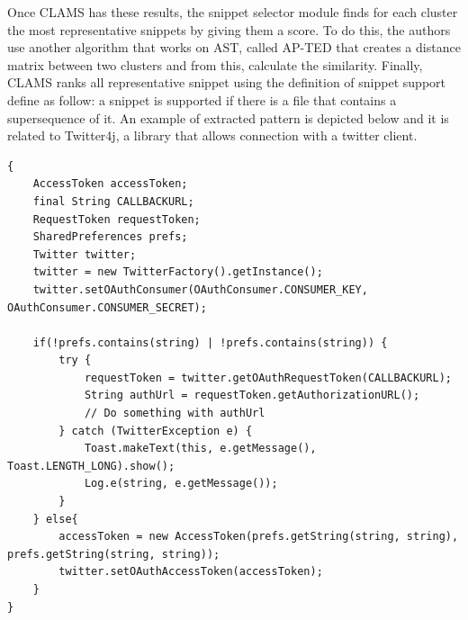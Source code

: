 Once CLAMS has these results, the snippet selector module finds for each cluster the most representative snippets by giving them a score. To do this, 
the authors use another algorithm that works on AST, called AP-TED that creates a distance matrix between two clusters and from this, calculate the similarity. Finally, CLAMS ranks all representative snippet using the definition of snippet support define as follow: a snippet is supported if there is a file that contains a supersequence of it. An example of extracted pattern is depicted below and it is related to Twitter4j, a library that allows connection with a twitter client. 
\begin{lstlisting}
{
    AccessToken accessToken;
    final String CALLBACKURL;
    RequestToken requestToken;
    SharedPreferences prefs;
    Twitter twitter;
    twitter = new TwitterFactory().getInstance();
    twitter.setOAuthConsumer(OAuthConsumer.CONSUMER_KEY, OAuthConsumer.CONSUMER_SECRET);

    if(!prefs.contains(string) | !prefs.contains(string)) {
        try {
            requestToken = twitter.getOAuthRequestToken(CALLBACKURL);
            String authUrl = requestToken.getAuthorizationURL();
            // Do something with authUrl
        } catch (TwitterException e) {
            Toast.makeText(this, e.getMessage(), Toast.LENGTH_LONG).show();
            Log.e(string, e.getMessage());
        }
    } else{
        accessToken = new AccessToken(prefs.getString(string, string), prefs.getString(string, string));
        twitter.setOAuthAccessToken(accessToken);
    }
}
	
\end{lstlisting}

